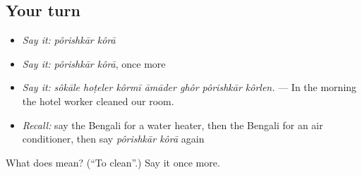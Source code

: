 \subsection*{Your turn}
\begin{itemize}
\raggedright
  \item \emph{Say it:} \emph{pôrishkār kôrā}
  \item \emph{Say it:} \emph{pôrishkār kôrā}, once more
  \item \emph{Say it:} \emph{sôkāle hoṭeler kôrmī āmāder ghôr pôrishkār kôrlen.} — In the morning the hotel worker cleaned our room.
  \item \emph{Recall:} say the Bengali for a water heater, then the Bengali for an air conditioner, then say \emph{pôrishkār kôrā} again
\end{itemize}

\begin{tcolorbox}[breakable,colback=teal!4,colframe=teal!35!black,title={Before you move on}]
What does   mean? (\textquotedblleft{}To clean\textquotedblright{}.) Say it once more.
\end{tcolorbox}
